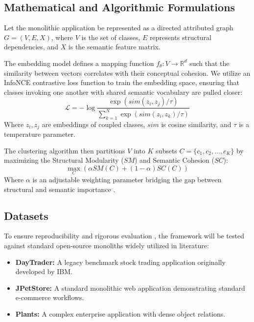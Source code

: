 \documentclass[12pt, a4paper]{article}
\begin{document}
\subsection{Mathematical and Algorithmic Formulations}
Let the monolithic application be represented as a directed attributed graph $G = (V, E, X)$, where $V$ is the set of classes, $E$ represents structural dependencies, and $X$ is the semantic feature matrix.

The embedding model defines a mapping function $f_\theta: V \to \mathbb{R}^d$ such that the similarity between vectors correlates with their conceptual cohesion. We utilize an InfoNCE contrastive loss function to train the embedding space, ensuring that classes invoking one another with shared semantic vocabulary are pulled closer:
\begin{equation}
\mathcal{L} = -\log \frac{\exp(sim(z_i, z_j)/\tau)}{\sum_{k=1}^{N} \exp(sim(z_i, z_k)/\tau)}
\end{equation}
Where $z_i, z_j$ are embeddings of coupled classes, $sim$ is cosine similarity, and $\tau$ is a temperature parameter.

The clustering algorithm then partitions $V$ into $K$ subsets $C = \{c_1, c_2, \dots, c_K\}$ by maximizing the Structural Modularity ($SM$) and Semantic Cohesion ($SC$):
\begin{equation}
\max_{C} \left( \alpha SM(C) + (1-\alpha) SC(C) \right)
\end{equation}
Where $\alpha$ is an adjustable weighting parameter bridging the gap between structural and semantic importance \cite{selmadji2020}.

\subsection{Datasets}
To ensure reproducibility and rigorous evaluation \cite{weerasinghe2026}, the framework will be tested against standard open-source monoliths widely utilized in literature:
\begin{itemize}
    \item \textbf{DayTrader:} A legacy benchmark stock trading application originally developed by IBM.
    \item \textbf{JPetStore:} A standard monolithic web application demonstrating standard e-commerce workflows.
    \item \textbf{Plants:} A complex enterprise application with dense object relations.
\end{itemize}
\end{document}
